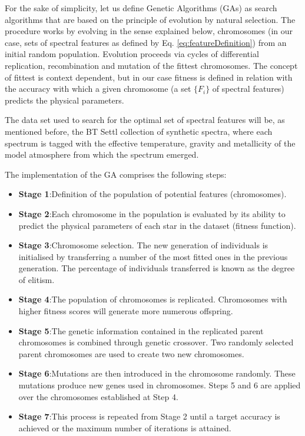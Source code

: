 For the sake of simplicity, let us define Genetic Algorithms (GAs) as
search algorithms that are based on the principle of evolution by
natural selection. The procedure works by evolving in the sense
explained below, chromosomes (in our case, sets of spectral features
as defined by Eq. \ref{eq:featureDefinition}) from an initial random
population. Evolution proceeds via cycles of differential replication,
recombination and mutation of the fittest chromosomes. The concept of
fittest is context dependent, but in our case fitness is defined in
relation with the accuracy with which a given chromosome (a set
$\{F_i\}$ of spectral features) predicts the physical parameters.

The data set used to search for the optimal set of spectral features
will be, as mentioned before, the BT Settl collection of synthetic
spectra, where each spectrum is tagged with the effective temperature,
gravity and metallicity of the model atmosphere from which the
spectrum emerged.

The implementation of the GA comprises the following steps:

\begin{itemize}
\item \textbf{Stage 1}:{Definition of the population of
potential features (chromosomes).}

\item \textbf{Stage 2}:{Each chromosome in the population
is evaluated by its ability to predict the physical parameters of each
star in the dataset (fitness function). }

\item \textbf{Stage 3}:{Chromosome selection. The new
generation of individuals is initialised by transferring a number of
the most fitted ones in the previous generation. The percentage of
individuals transferred is known as the degree of elitism. }

\item \textbf{Stage 4}:{The population of chromosomes is replicated. 
 Chromosomes with higher fitness scores will generate more numerous
 offspring.}

\item \textbf{Stage 5}:{The genetic information contained in
the replicated parent chromosomes is combined through genetic
crossover. Two randomly selected parent chromosomes are used to create
two new chromosomes.}

\item \textbf{Stage 6}:{Mutations are then introduced in the
chromosome randomly. These mutations produce new genes used in
chromosomes.  Steps 5 and 6 are applied over the chromosomes
established at Step 4.}

\item \textbf{Stage 7}:{This process is repeated from Stage 2 until 
a target accuracy is achieved or the maximum number of iterations is
attained.}

\end{itemize}

